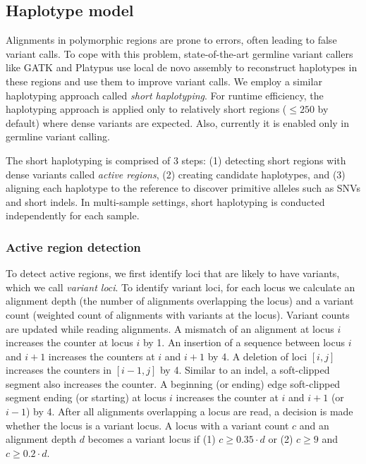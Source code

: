 \documentclass{article}
\begin{document}
\subsection{Haplotype model}

Alignments in polymorphic regions are prone to errors, often leading to false variant calls. To cope with this problem, state-of-the-art germline variant callers like GATK and Platypus use local de novo assembly to reconstruct haplotypes in these regions and use them to improve variant calls. We employ a similar haplotyping approach called {\em short haplotyping}. For runtime efficiency, the haplotyping approach is applied only to relatively short regions ($\leq 250$ by default) where dense variants are expected. Also, currently it is enabled only in germline variant calling.

The short haplotyping is comprised of 3 steps: (1) detecting short regions with dense variants called {\em active regions}, (2) creating candidate haplotypes, and (3) aligning each haplotype to the reference to discover primitive alleles such as SNVs and short indels. In multi-sample settings, short haplotyping is conducted independently for each sample.

\subsubsection{Active region detection}
To detect active regions, we first identify loci that are likely to have variants, which we call {\em variant loci}. To identify variant loci, for each locus we calculate an alignment depth (the number of alignments overlapping the locus) and a variant count (weighted count of alignments with variants at the locus). Variant counts are updated while reading alignments. A mismatch of an alignment at locus $i$ increases the counter at locus $i$ by 1. An insertion of a sequence between locus $i$ and $i+1$ increases the counters at $i$ and $i+1$ by 4. A deletion of loci $[i,j]$ increases the counters in $[i-1,j]$ by 4. Similar to an indel, a soft-clipped segment also increases the counter. A beginning (or ending) edge soft-clipped segment ending (or starting) at locus $i$ increases the counter at $i$ and $i+1$ (or $i-1$) by 4. After all alignments overlapping a locus are read, a decision is made whether the locus is a variant locus. A locus with a variant count $c$ and an alignment depth $d$ becomes a variant locus if (1) $c \geq 0.35 \cdot d$ or (2) $c \geq 9$ and $c \geq 0.2 \cdot d$.
\end{document}
